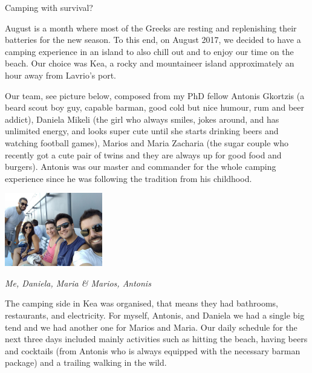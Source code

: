 \documentclass[10pt,a4paper]{article} %
\newcommand{\NewsItem}[1]{ %
\usefont{T1}{fvs}{n}{n} %
\vspace{24pt}\large #1\vspace{3pt} %
\par \normalsize \normalfont}
\begin{document}
\begin{multicols}{3}
\NewsItem{Camping with survival?}

August is a month where most of the Greeks are resting and replenishing their 
batteries for the new season. 
To this end, on August 2017, we decided to have a camping experience in an island to also chill 
out and to enjoy our time on the beach. 
Our choice was Kea, a rocky and mountaineer island approximately an hour away 
from Lavrio's port.


Our team, see picture below, composed from my PhD fellow Antonis Gkortzis 
(a beard scout boy guy, capable barman, good cold but nice humour, rum and beer addict), 
Daniela Mikeli (the girl who always smiles, jokes around, and has unlimited energy, 
and looks super cute until she starts drinking beers and watching football games), 
Marios and Maria Zacharia (the sugar couple who recently got a cute pair of twins 
and they are always up for good food and burgers).  
Antonis was our master and commander for the whole camping experience since he was 
following the tradition from his childhood. 


\begin{center}
	\includegraphics[width=0.32\textwidth]{media/the_dream_team.jpg}
	\par\textit{Me, Daniela, Maria \& Marios, Antonis}
\end{center}


The camping side in Kea was organised, that means they had bathrooms, restaurants, 
and electricity. 
For myself, Antonis, and Daniela we had a single big tend and we had another one for 
Marios and Maria. 
Our daily schedule for the next three days included mainly activities such as hitting 
the beach, having beers and cocktails (from Antonis who is always equipped with the 
necessary barman package) and a trailing walking in the wild.



\end{multicols}
\end{document}
